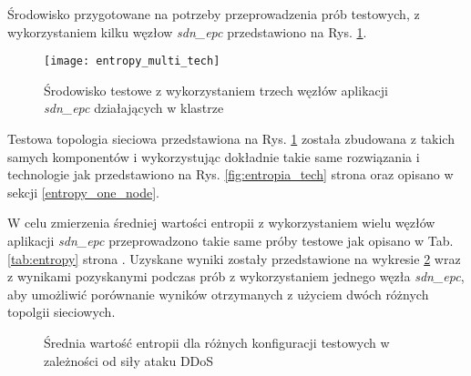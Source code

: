Środowisko przygotowane na potrzeby przeprowadzenia prób testowych, z
wykorzystaniem kilku węzłow \textit{sdn\_epc} przedstawiono na Rys.
\ref{fig:entropy_multi_tech}.

\begin{figure}[h]
\centering
\texttt{[image: entropy\_multi\_tech]}
\caption{Środowisko testowe z wykorzystaniem trzech węzłów aplikacji
  \textit{sdn\_epc} działających w klastrze}
\label{fig:entropy_multi_tech}
\end{figure}

Testowa topologia sieciowa przedstawiona na Rys. \ref{fig:entropy_multi_tech}
została zbudowana z takich samych komponentów i wykorzystując dokładnie takie
same rozwiązania i technologie jak przedstawiono na Rys. \ref{fig:entropia_tech}
strona \pageref{fig:entropia_tech} oraz opisano w sekcji \ref{entropy_one_node}.

W celu zmierzenia średniej wartości entropii z wykorzystaniem wielu węzłów
aplikacji \textit{sdn\_epc} przeprowadzono takie same próby testowe jak opisano
w Tab. \ref{tab:entropy} strona \pageref{tab:entropy}. Uzyskane wyniki zostały
przedstawione na wykresie \ref{plot:entropy_multi_node} wraz z wynikami
pozyskanymi podczas prób z wykorzystaniem jednego węzła \textit{sdn\_epc}, aby
umożliwić porównanie wyników otrzymanych z użyciem dwóch różnych topolgii
sieciowych.

\begin{figure}[h]
\centering
{}
\caption{Średnia wartość entropii dla różnych konfiguracji testowych w
  zależności od siły ataku DDoS}
\label{plot:entropy_multi_node}
\end{figure}

